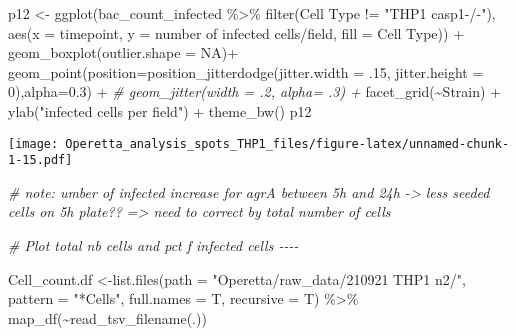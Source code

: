 \documentclass[
]{article}
\newenvironment{Shaded}{\begin{snugshade}}{\end{snugshade}}
\newcommand{\AttributeTok}[1]{\textcolor[rgb]{0.77,0.63,0.00}{#1}}
\newcommand{\CommentTok}[1]{\textcolor[rgb]{0.56,0.35,0.01}{\textit{#1}}}
\newcommand{\ConstantTok}[1]{\textcolor[rgb]{0.00,0.00,0.00}{#1}}
\newcommand{\DecValTok}[1]{\textcolor[rgb]{0.00,0.00,0.81}{#1}}
\newcommand{\FloatTok}[1]{\textcolor[rgb]{0.00,0.00,0.81}{#1}}
\newcommand{\FunctionTok}[1]{\textcolor[rgb]{0.00,0.00,0.00}{#1}}
\newcommand{\NormalTok}[1]{#1}
\newcommand{\OtherTok}[1]{\textcolor[rgb]{0.56,0.35,0.01}{#1}}
\newcommand{\SpecialCharTok}[1]{\textcolor[rgb]{0.00,0.00,0.00}{#1}}
\newcommand{\StringTok}[1]{\textcolor[rgb]{0.31,0.60,0.02}{#1}}
\begin{document}
\begin{Shaded}
\begin{Highlighting}[]
\NormalTok{p12 }\OtherTok{\textless{}{-}} \FunctionTok{ggplot}\NormalTok{(bac\_count\_infected }\SpecialCharTok{\%\textgreater{}\%} 
                \FunctionTok{filter}\NormalTok{(}\StringTok{\textasciigrave{}}\AttributeTok{Cell Type}\StringTok{\textasciigrave{}} \SpecialCharTok{!=} \StringTok{"THP1 casp1{-}/{-}"}\NormalTok{), }\FunctionTok{aes}\NormalTok{(}\AttributeTok{x =}\NormalTok{ timepoint, }\AttributeTok{y =} \StringTok{\textasciigrave{}}\AttributeTok{number of infected cells/field}\StringTok{\textasciigrave{}}\NormalTok{, }\AttributeTok{fill =} \StringTok{\textasciigrave{}}\AttributeTok{Cell Type}\StringTok{\textasciigrave{}}\NormalTok{)) }\SpecialCharTok{+}
  \FunctionTok{geom\_boxplot}\NormalTok{(}\AttributeTok{outlier.shape =} \ConstantTok{NA}\NormalTok{)}\SpecialCharTok{+}
  \FunctionTok{geom\_point}\NormalTok{(}\AttributeTok{position=}\FunctionTok{position\_jitterdodge}\NormalTok{(}\AttributeTok{jitter.width =}\NormalTok{ .}\DecValTok{15}\NormalTok{, }\AttributeTok{jitter.height =} \DecValTok{0}\NormalTok{),}\AttributeTok{alpha=}\FloatTok{0.3}\NormalTok{) }\SpecialCharTok{+}
  \CommentTok{\#  geom\_jitter(width = .2, alpha= .3) +}
  \FunctionTok{facet\_grid}\NormalTok{(}\SpecialCharTok{\textasciitilde{}}\NormalTok{Strain) }\SpecialCharTok{+}
  \FunctionTok{ylab}\NormalTok{(}\StringTok{"infected cells per field"}\NormalTok{) }\SpecialCharTok{+}
  \FunctionTok{theme\_bw}\NormalTok{()}
\NormalTok{p12}
\end{Highlighting}
\end{Shaded}

\texttt{[image: Operetta\_analysis\_spots\_THP1\_files/figure-latex/unnamed-chunk-1-15.pdf]}

\begin{Shaded}
\begin{Highlighting}[]
\CommentTok{\# note: umber of infected increase for agrA between 5h and 24h {-}\textgreater{} less seeded cells on 5h plate?? =\textgreater{} need to correct by total number of cells}

\CommentTok{\# Plot total nb cells and pct f infected cells {-}{-}{-}{-}}

\NormalTok{Cell\_count.df }\OtherTok{\textless{}{-}}\FunctionTok{list.files}\NormalTok{(}\AttributeTok{path =} \StringTok{"Operetta/raw\_data/210921 THP1 n2/"}\NormalTok{, }\AttributeTok{pattern =} \StringTok{"*Cells"}\NormalTok{, }\AttributeTok{full.names =}\NormalTok{ T, }\AttributeTok{recursive =}\NormalTok{ T) }\SpecialCharTok{\%\textgreater{}\%} 
  \FunctionTok{map\_df}\NormalTok{(}\SpecialCharTok{\textasciitilde{}}\FunctionTok{read\_tsv\_filename}\NormalTok{(.)) }
\end{Highlighting}
\end{Shaded}
\end{document}
